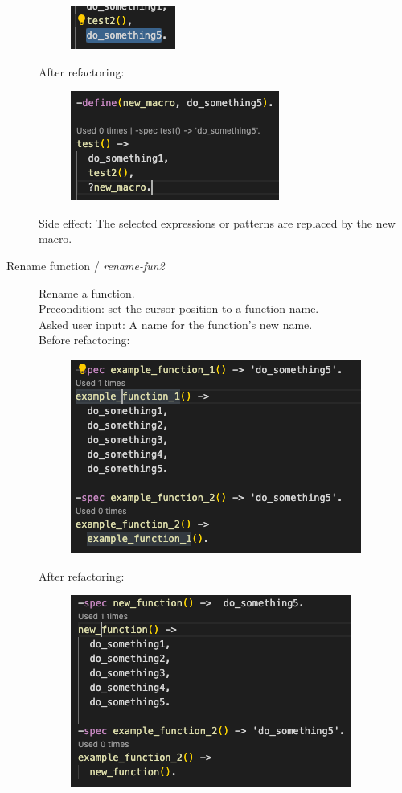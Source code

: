 \begin{description}
	\begin{figure}[H]
	\centering
	\includegraphics[]{images/macro_before.png}
    \end{figure}
	After refactoring:
	\begin{figure}[H]
	\centering
	\includegraphics[]{images/macro_after.png}
    \end{figure}
	Side effect: The selected expressions or patterns are replaced by the new macro.
	\item[Rename function / \textit{rename-fun2}] Rename a function.
	\\Precondition: set the cursor position to a function name.
	\\Asked user input: A name for the function's new name. 
	\\Before refactoring:
	\begin{figure}[H]
	\centering
	\includegraphics[]{images/rename_fun_before.png}
    \end{figure}
	After refactoring:
	\begin{figure}[H]
	\centering
	\includegraphics[]{images/rename_fun_after.png}

\end{figure}
\end{description}
